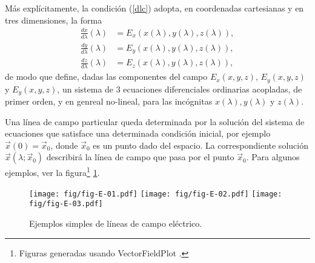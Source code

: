 Más explícitamente, la condición (\ref{dlc}) adopta, en coordenadas cartesianas y en tres dimensiones, la forma 
\begin{align}
\frac{dx}{d\lambda}(\lambda) &= {E_x}(x(\lambda),y(\lambda),z(\lambda)), \\
\frac{dy}{d\lambda}(\lambda) &= {E_y}(x(\lambda),y(\lambda),z(\lambda)),\\
\frac{dz}{d\lambda}(\lambda) &= E_z(x(\lambda),y(\lambda),z(\lambda)),
\end{align}
de modo que define, dadas las componentes del campo $E_x(x,y,z)$, $E_y(x,y,z)$ y $E_y(x,y,z)$, un sistema de 3 ecuaciones diferenciales ordinarias acopladas, de primer orden, y en genreal no-lineal, para las incógnitas $x(\lambda),y(\lambda)$ y $z(\lambda)$.

Una línea de campo particular queda determinada por la solución del sistema de ecuaciones que satisface una determinada condición inicial, por ejemplo $\vec{x}(0)=\vec{x}_0$, donde $\vec{x}_0$ es un punto dado del espacio. La correspondiente solución $\vec{x}(\lambda;\vec{x}_0)$ describirá la línea de campo que pasa por el punto $\vec{x}_0$. Para algunos ejemplos, ver la figura\footnote{Figuras generadas usando VectorFieldPlot \cite{VFP}.} \ref{fig-E}.

\begin{center}
\begin{figure}[H]
\centerline{\texttt{[image: fig/fig-E-01.pdf]}\hfill 
\texttt{[image: fig/fig-E-02.pdf]}\hfill
\texttt{[image: fig/fig-E-03.pdf]}}
\caption{Ejemplos simples de líneas de campo eléctrico.}
\label{fig-E}
\end{figure}
\end{center}
